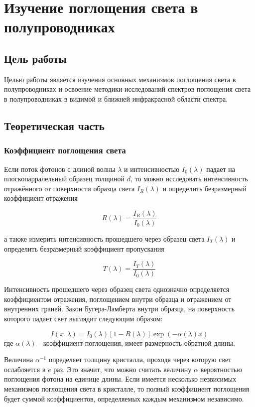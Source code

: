 \chapter{Изучение поглощения света в полупроводниках}

\section{Цель работы}
Целью работы является изучения основных механизмов поглощения света в полупроводниках и освоение методики исследований спектров поглощения света в полупроводниках в видимой и ближней инфракрасной области спектра.

\section{Теоретическая часть}
\subsection{Коэффициент поглощения света}
Если поток фотонов с длиной волны $\lambda$ и интенсивностью $I_{0}(\lambda)$ падает на плоскопарралельный образец толщиной $d$, то можно исследовать интенсивность отражённого от поверхности образца света $I_{R}(\lambda)$ и определить безразмерный коэффициент отражения

\begin{equation}
R(\lambda) = \frac{I_{R}(\lambda)}{I_{0}(\lambda)}
\end{equation}

а также измерить интенсивность прошедшего через образец света $I_{T}(\lambda)$ и определить безразмерный коэффициент пропускания

\begin{equation}
T(\lambda) = \frac{I_{T}(\lambda)}{I_{0}(\lambda)}
\end{equation}

Интенсивность прошедшего через образец света однозначно определяется коэффициентом отражения, поглощением внутри образца и отражением от внутренних граней. Закон Бугера-Ламберта внутри образца, на поверхность которого падает свет выглядит следующим образом:

\begin{equation}
I(x, \lambda) = I_{0}(\lambda) \left[ 1 - R(\lambda) \right] \exp{(- \alpha (\lambda) x )}
\end{equation}
где $\alpha(\lambda)$ - коэффициент поглощения, имеет размерность обратной длины.

Величина $\alpha^{-1}$ определяет толщину кристалла, проходя через которую свет ослабляется в $e$ раз. Это значит, что можно считать величину $\alpha$ вероятностью поглощения фотона на единице длины. Если имеется несколько незвисимых механизмов поглощения света в кристалле, то полный коэффициент поглощения будет суммой коэффициентов, определяемых каждым механизмом независимо.

